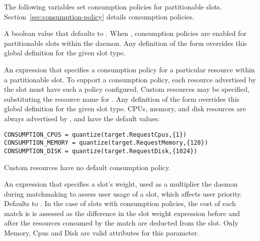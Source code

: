 The following variables set consumption policies for partitionable slots.
Section~\ref{sec:consumption-policy} details consumption policies.

\begin{description}

\label{param:ConsumptionPolicy}
\item[\Macro{CONSUMPTION\_POLICY}]
  A boolean value that defaults to .
  When , consumption policies are enabled for partitionable
  slots within the  daemon.  
  Any definition of the form 
  overrides this global definition for the given slot type.
  
\label{param:ConsumptionResource}
\item[\Macro{CONSUMPTION\_<Resource>}]
  An expression that specifies a consumption policy for a particular 
  resource within a partitionable slot.  
  To support a consumption policy, each resource advertised by the
  slot must have such a policy configured.
  Custom resources may be specified, substituting the resource name
  for .
  Any definition of the form 
  overrides this global definition for the given slot type.
  CPUs, memory, and disk resources
  are always advertised by , and have the default values:
\begin{verbatim}
CONSUMPTION_CPUS = quantize(target.RequestCpus,{1})
CONSUMPTION_MEMORY = quantize(target.RequestMemory,{128})
CONSUMPTION_DISK = quantize(target.RequestDisk,{1024})
\end{verbatim}
  Custom resources have no default consumption policy.

\label{param:SlotWeight}
\item[\Macro{SLOT\_WEIGHT}]
  An expression that specifies a slot's weight, used as a multiplier
  the  daemon during matchmaking to assess user usage
  of a slot, which affects user priority.
  Defaults to .  
  In the case of slots with consumption policies, the cost of each match is
  is assessed as the difference in the slot weight expression before and after
  the resources consumed by the match are deducted from the slot.  Only
  Memory, Cpus and Disk are valid attributes for this parameter.


\end{description}
